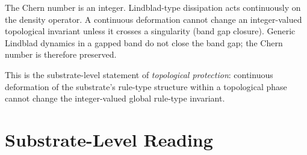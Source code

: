\documentclass[11pt,a4paper]{article}
\begin{document}
The Chern number is an integer. Lindblad-type dissipation acts continuously on the density operator. A continuous deformation cannot change an integer-valued topological invariant unless it crosses a singularity (band gap closure). Generic Lindblad dynamics in a gapped band do not close the band gap; the Chern number is therefore preserved.

This is the substrate-level statement of \emph{topological protection}: continuous deformation of the substrate's rule-type structure within a topological phase cannot change the integer-valued global rule-type invariant.

\section{Substrate-Level Reading}
\end{document}
